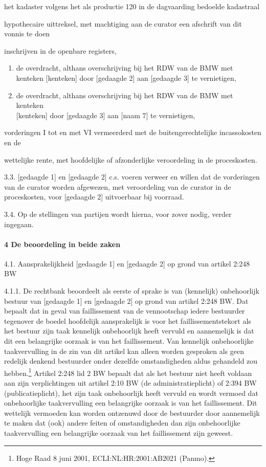 \documentclass[
  dutch,
  a4paper,
]{article}
\begin{document}
het kadaster volgens het als productie 120 in de dagvaarding bedoelde kadastraal

hypothecaire uittreksel, met machtiging aan de curator een afschrift van dit vonnis te doen

inschrijven in de openbare registers,

\begin{enumerate}
\def\labelenumi{\arabic{enumi}.}
\setcounter{enumi}{20}
\item
  de overdracht, althans overschrijving bij het RDW van de BMW met kenteken {[}kenteken{]} door {[}gedaagde 2{]} aan {[}gedaagde 3{]} te vernietigen,
\item
  de overdracht, althans overschrijving bij het RDW van de BMW met kenteken\\
  {[}kenteken{]} door {[}gedaagde 3{]} aan {[}naam 7{]} te vernietigen,
\end{enumerate}

vorderingen I tot en met VI vermeerderd met de buitengerechtelijke incassokosten en de

wettelijke rente, met hoofdelijke of afzonderlijke veroordeling in de proceskosten.

3.3. {[}gedaagde 1{]} en {[}gedaagde 2{]} c.s. voeren verweer en willen dat de vorderingen van de curator worden afgewezen, met veroordeling van de curator in de proceskosten, voor {[}gedaagde 2{]} uitvoerbaar bij voorraad.

3.4. Op de stellingen van partijen wordt hierna, voor zover nodig, verder ingegaan.

\paragraph{4 De beoordeling in beide zaken}\label{de-beoordeling-in-beide-zaken}

4.1. Aansprakelijkheid {[}gedaagde 1{]} en {[}gedaagde 2{]} op grond van artikel 2:248 BW

4.1.1. De rechtbank beoordeelt als eerste of sprake is van (kennelijk) onbehoorlijk bestuur van {[}gedaagde 1{]} en {[}gedaagde 2{]} op grond van artikel 2:248 BW. Dat bepaalt dat in geval van faillissement van de vennootschap iedere bestuurder tegenover de boedel hoofdelijk aansprakelijk is voor het faillissementstekort als het bestuur zijn taak kennelijk onbehoorlijk heeft vervuld en aannemelijk is dat dit een belangrijke oorzaak is van het faillissement. Van kennelijk onbehoorlijke taakvervulling in de zin van dit artikel kan alleen worden gesproken als geen redelijk denkend bestuurder onder dezelfde omstandigheden aldus gehandeld zou hebben.\footnote{Hoge Raad 8 juni 2001, ECLI:NL:HR:2001:AB2021 (Panmo).} Artikel 2:248 lid 2 BW bepaalt dat als het bestuur niet heeft voldaan aan zijn verplichtingen uit artikel 2:10 BW (de administratieplicht) of 2:394 BW (publicatieplicht), het zijn taak onbehoorlijk heeft vervuld en wordt vermoed dat onbehoorlijke taakvervulling een belangrijke oorzaak is van het faillissement. Dit wettelijk vermoeden kan worden ontzenuwd door de bestuurder door aannemelijk te maken dat (ook) andere feiten of omstandigheden dan zijn onbehoorlijke taakvervulling een belangrijke oorzaak van het faillissement zijn geweest.
\end{document}
